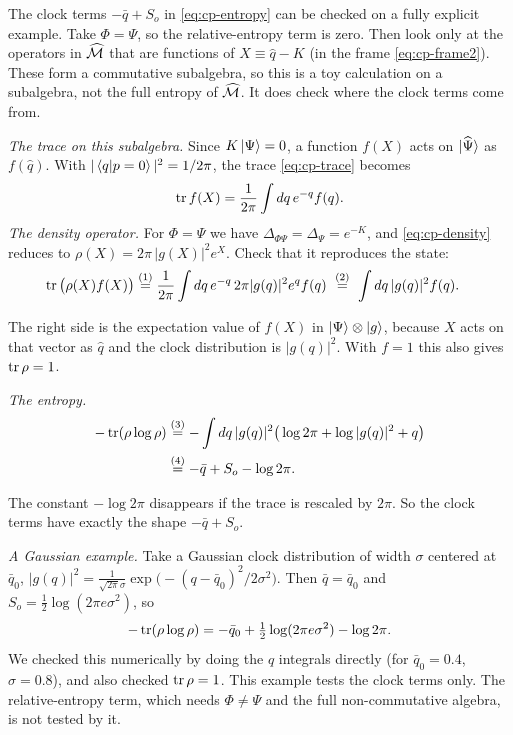 \begin{workedexamplebox}
The clock terms $-\bar q+S_o$ in \eqref{eq:cp-entropy} can be checked on a fully explicit example. Take
$\Phi=\Psi$, so the relative-entropy term is zero. Then look only at the operators in $\widehat{\mathcal{M}}$ that are
functions of $X\equiv\hat q-K$ (in the frame \eqref{eq:cp-frame2}). These form a commutative subalgebra, so
this is a toy calculation on a subalgebra, not the full entropy of $\widehat{\mathcal{M}}$. It does check where the clock
terms come from.

\emph{The trace on this subalgebra.} Since $K\ket\Psi=0$, a function $f(X)$ acts on $\ket{\widehat\Psi}$ as
$f(\hat q)$. With $|\braket{q|p=0}|^2=1/2\pi$, the trace \eqref{eq:cp-trace} becomes
\[
\operatorname{tr} f(X) = \frac{1}{2\pi}\int dq\,e^{-q}f(q) .
\]
\emph{The density operator.} For $\Phi=\Psi$ we have $\Delta_{\Phi\Psi}=\Delta_\Psi=e^{-K}$, and
\eqref{eq:cp-density} reduces to $\rho(X)=2\pi\,|g(X)|^2e^{X}$. Check that it reproduces the state:
\begin{align}
\operatorname{tr}\big(\rho(X)f(X)\big)
&\overset{(1)}{=} \frac{1}{2\pi}\int dq\,e^{-q}\,2\pi|g(q)|^2e^{q}f(q)
\ \overset{(2)}{=}\ \int dq\,|g(q)|^2f(q) . \notag
\end{align}
\quad
{}

The right side is the expectation value of $f(X)$ in $\ket\Psi\otimes\ket g$, because $X$ acts on that vector
as $\hat q$ and the clock distribution is $|g(q)|^2$. With $f=1$ this also gives $\operatorname{tr}\rho=1$.

\emph{The entropy.}
\begin{align}
-\operatorname{tr}(\rho\log\rho)
&\overset{(3)}{=} -\int dq\,|g(q)|^2\big(\log 2\pi+\log|g(q)|^2+q\big) \notag\\
&\overset{(4)}{=} -\bar q + S_o - \log 2\pi . \notag
\end{align}
\quad
{}

The constant $-\log2\pi$ disappears if the trace is rescaled by $2\pi$. So the clock terms have exactly the
shape $-\bar q+S_o$.

\emph{A Gaussian example.} Take a Gaussian clock distribution of width $\sigma$ centered at $\bar q_0$,
$|g(q)|^2=\frac{1}{\sqrt{2\pi}\sigma}\exp\!\big(-(q-\bar q_0)^2/2\sigma^2\big)$. Then $\bar q=\bar q_0$ and
$S_o=\tfrac12\log(2\pi e\sigma^2)$, so
\[
-\operatorname{tr}(\rho\log\rho) = -\bar q_0 + \tfrac12\log(2\pi e\sigma^2) - \log 2\pi .
\]
We checked this numerically by doing the $q$ integrals directly (for $\bar q_0=0.4$, $\sigma=0.8$), and also
checked $\operatorname{tr}\rho=1$. This example tests the clock terms only. The relative-entropy term, which needs
$\Phi\ne\Psi$ and the full non-commutative algebra, is not tested by it.
\end{workedexamplebox}

